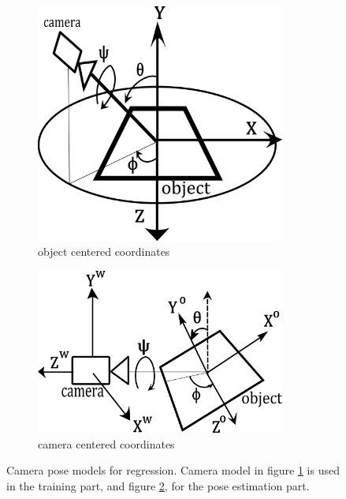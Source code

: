 \documentclass[annual]{acmsiggraph}
\begin{document}
\begin{figure}[h]

\center
\begin{subfigure}[c]{0.4\columnwidth} \center \includegraphics[width=0.9\textwidth]{images/camModel_objCenter.png} 
\caption{object centered coordinates} 
\label{img:cameraModel:obj}
\end{subfigure}%
\begin{subfigure}[c]{0.6\columnwidth} \center \includegraphics[width=0.9\textwidth]{images/camModel_camCenter.png} 
\caption{camera centered coordinates}
\label{img:cameraModel:cam}
\end{subfigure}%
\caption{Camera pose models for regression. Camera model in figure \ref{img:cameraModel:obj} is used in the training part, and figure \ref{img:cameraModel:cam}, for the pose estimation part. }
\label{img:cameraModel}
\end{figure}
\end{document}
